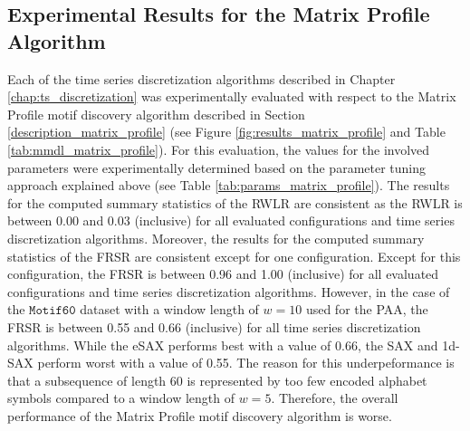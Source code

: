\subsection*{Experimental Results for the Matrix Profile Algorithm}
Each of the time series discretization algorithms described in Chapter \ref{chap:ts_discretization} was experimentally evaluated with respect to the Matrix Profile motif discovery algorithm described in Section \ref{description_matrix_profile} (see Figure \ref{fig:results_matrix_profile} and Table \ref{tab:mmdl_matrix_profile}). For this evaluation, the values for the involved parameters were experimentally determined based on the parameter tuning approach explained above (see Table \ref{tab:params_matrix_profile}). \newline
The results for the computed summary statistics of the \ac{RWLR} are consistent as the \ac{RWLR} is between 0.00 and 0.03 (inclusive) for all evaluated configurations and time series discretization algorithms. Moreover, the results for the computed summary statistics of the \ac{FRSR} are consistent except for one configuration. Except for this configuration, the \ac{FRSR} is between 0.96 and 1.00 (inclusive) for all evaluated configurations and time series discretization algorithms. However, in the case of the $\texttt{Motif60}$ dataset with a window length of $w = 10$ used for the \ac{PAA}, the \ac{FRSR} is between 0.55 and 0.66 (inclusive) for all time series discretization algorithms. While the \ac{eSAX} performs best with a value of 0.66, the \ac{SAX} and \ac{1d-SAX} perform worst with a value of 0.55. \newline
The reason for this underpeformance is that a subsequence of length 60 is represented by too few encoded alphabet symbols compared to a window length of $w = 5$. Therefore, the overall performance of the Matrix Profile motif discovery algorithm is worse. 
\newpage
